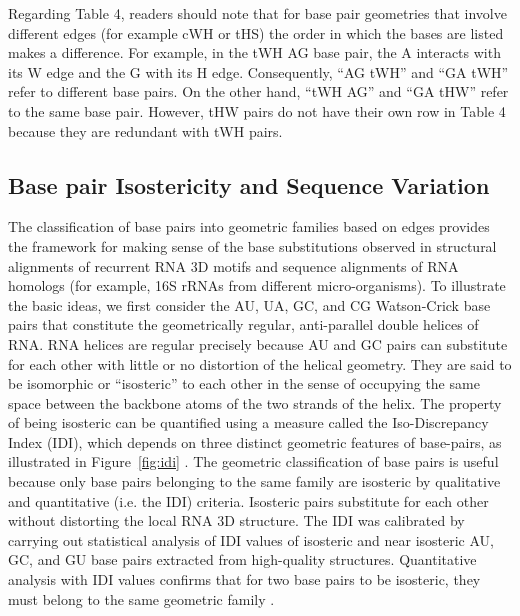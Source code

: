 Regarding Table 4, readers should note that for base pair geometries that
involve different edges (for example cWH or tHS) the order in which the bases
are listed makes a difference. For example, in the tWH AG base pair, the A
interacts with its W edge and the G with its H edge. Consequently, ``AG tWH''
and ``GA tWH'' refer to different base pairs. On the other hand, ``tWH AG'' and
``GA tHW'' refer to the same base pair. However, tHW pairs do not have their own
row in Table 4 because they are redundant with tWH pairs. 

\subsection{Base pair Isostericity and Sequence Variation}

The classification of base pairs into geometric families based on edges provides
the framework for making sense of the base substitutions observed in structural
alignments of recurrent RNA 3D motifs and sequence alignments of RNA homologs
(for example, 16S rRNAs from different micro-organisms). To illustrate the basic
ideas, we first consider the AU, UA, GC, and CG Watson-Crick base pairs that
constitute the geometrically regular, anti-parallel double helices of RNA. RNA
helices are regular precisely because AU and GC pairs can substitute for each
other with little or no distortion of the helical geometry. They are said to be
isomorphic or “isosteric” to each other in the sense of occupying the same space
between the backbone atoms of the two strands of the helix. The property of
being isosteric can be quantified using a measure called the Iso-Discrepancy
Index (IDI), which depends on three distinct geometric features of base-pairs,
as illustrated in Figure~\ref{fig:idi} \cite{Stombaugh2009}. The geometric classification
of base pairs is useful because only base pairs belonging to the same family are
isosteric by qualitative and quantitative (i.e. the IDI) criteria. Isosteric
pairs substitute for each other without distorting the local RNA 3D structure.
The IDI was calibrated by carrying out statistical analysis of IDI values of
isosteric and near isosteric AU, GC, and GU base pairs extracted from
high-quality structures. Quantitative analysis with IDI values confirms that for
two base pairs to be isosteric, they must belong to the same geometric family
\cite{Stombaugh2009}. 

